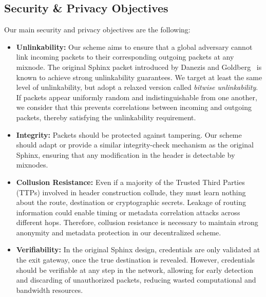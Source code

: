 \subsection{Security \& Privacy Objectives}
\label{sec:sp-objectives}

Our main security and privacy objectives are the following:
\begin{itemize}
        \item \textbf{Unlinkability:} Our scheme aims to ensure that a global adversary cannot link incoming packets to their corresponding outgoing packets at any mixnode.
        The original Sphinx packet introduced by Danezis and Goldberg~\cite{sphinx} is known to achieve strong unlinkability guarantees.
        We target at least the same level of unlinkability, but adopt a relaxed version called \textit{bitwise unlinkability}.
        If packets appear uniformly random and indistinguishable from one another, we consider that this prevents correlations between incoming and outgoing packets, thereby satisfying the unlinkability requirement.

        \item \textbf{Integrity:} Packets should be protected against tampering.
        Our scheme should adapt or provide a similar integrity-check mechanism as the original Sphinx, ensuring that any modification in the header is detectable by mixnodes.

        \item \textbf{Collusion Resistance:} Even if a majority of the Trusted Third Parties (TTPs) involved in header construction collude, they must learn nothing about the route, destination or cryptographic secrets.
        Leakage of routing information could enable timing or metadata correlation attacks across different hops.
        Therefore, collusion resistance is necessary to maintain strong anonymity and metadata protection in our decentralized scheme.

        \item \textbf{Verifiability:} In the original Sphinx design, credentials are only validated at the exit gateway, once the true destination is revealed.
        However, credentials should be verifiable at any step in the network, allowing for early detection and discarding of unauthorized packets, reducing wasted computational and bandwidth resources.
\end{itemize}
